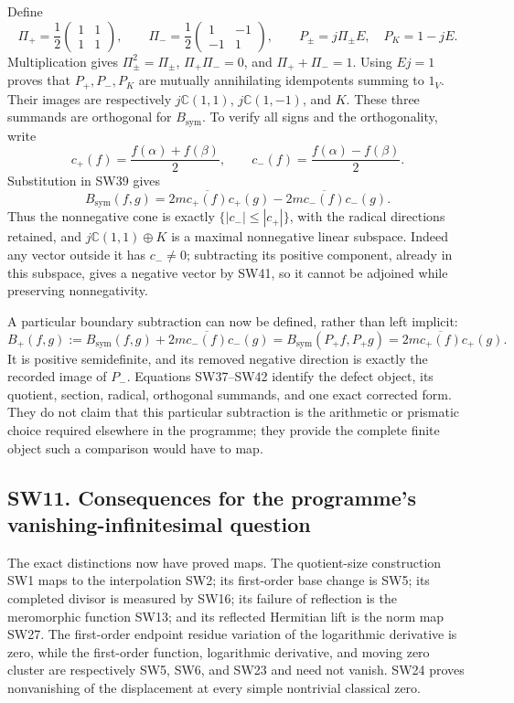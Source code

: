 \documentclass[
  10pt,
  a4paper,
]{article}
\begin{document}
Define \[
\Pi_+=\frac12\begin{pmatrix}1&1\\1&1\end{pmatrix},\qquad
\Pi_-=\frac12\begin{pmatrix}1&-1\\-1&1\end{pmatrix},\qquad
P_\pm=j\Pi_\pm E,\quad P_K=1-jE.
\tag{SW40}
\] Multiplication gives \(\Pi_\pm^2=\Pi_\pm\), \(\Pi_+\Pi_-=0\), and
\(\Pi_++\Pi_-=1\). Using \(Ej=1\) proves that \(P_+,P_-,P_K\) are
mutually annihilating idempotents summing to \(1_V\). Their images are
respectively \(j\mathbb C(1,1)\), \(j\mathbb C(1,-1)\), and \(K\). These
three summands are orthogonal for \(B_{\mathrm{sym}}\). To verify all
signs and the orthogonality, write \[
c_+(f)=\frac{f(\alpha)+f(\beta)}2,\qquad
c_-(f)=\frac{f(\alpha)-f(\beta)}2.
\] Substitution in SW39 gives \[
B_{\mathrm{sym}}(f,g)=2m\overline{c_+(f)}c_+(g)
-2m\overline{c_-(f)}c_-(g).
\tag{SW41}
\] Thus the nonnegative cone is exactly \(\{|c_-|\le|c_+|\}\), with the
radical directions retained, and \(j\mathbb C(1,1)\oplus K\) is a
maximal nonnegative linear subspace. Indeed any vector outside it has
\(c_-\ne0\); subtracting its positive component, already in this
subspace, gives a negative vector by SW41, so it cannot be adjoined
while preserving nonnegativity.

A particular boundary subtraction can now be defined, rather than left
implicit: \[
B_+(f,g):=B_{\mathrm{sym}}(f,g)+2m\overline{c_-(f)}c_-(g)
=B_{\mathrm{sym}}(P_+f,P_+g)=2m\overline{c_+(f)}c_+(g).
\tag{SW42}
\] It is positive semidefinite, and its removed negative direction is
exactly the recorded image of \(P_-\). Equations SW37--SW42 identify the
defect object, its quotient, section, radical, orthogonal summands, and
one exact corrected form. They do not claim that this particular
subtraction is the arithmetic or prismatic choice required elsewhere in
the programme; they provide the complete finite object such a comparison
would have to map.

\subsection{SW11. Consequences for the programme's
vanishing-infinitesimal
question}\label{sw11.-consequences-for-the-programmes-vanishing-infinitesimal-question}

The exact distinctions now have proved maps. The quotient-size
construction SW1 maps to the interpolation SW2; its first-order base
change is SW5; its completed divisor is measured by SW16; its failure of
reflection is the meromorphic function SW13; and its reflected Hermitian
lift is the norm map SW27. The first-order endpoint residue variation of
the logarithmic derivative is zero, while the first-order function,
logarithmic derivative, and moving zero cluster are respectively SW5,
SW6, and SW23 and need not vanish. SW24 proves nonvanishing of the
displacement at every simple nontrivial classical zero.
\end{document}
